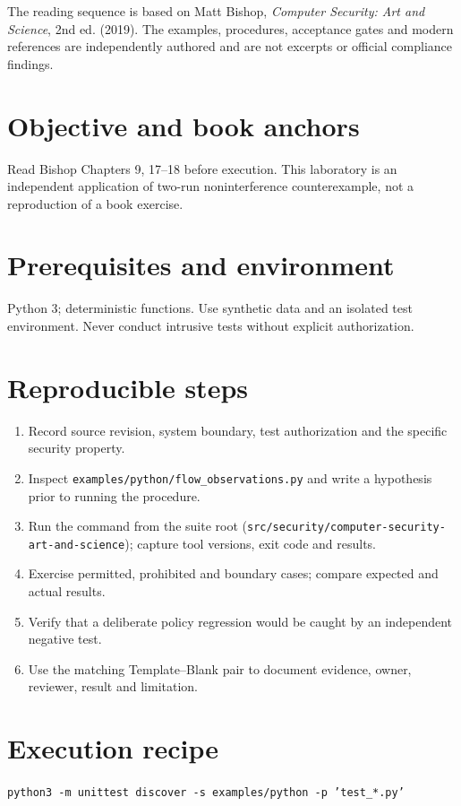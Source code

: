 \documentclass[10pt,letterpaper]{article}
\begin{document}
\makedoctocpage
\begin{notebox}
The reading sequence is based on Matt Bishop, \emph{Computer Security: Art and Science}, 2nd ed. (2019). The examples, procedures, acceptance gates and modern references are independently authored and are not excerpts or official compliance findings.
\end{notebox}
\section{Objective and book anchors}
Read Bishop Chapters 9, 17--18 before execution. This laboratory is an independent application of two-run noninterference counterexample, not a reproduction of a book exercise.
\section{Prerequisites and environment}
Python 3; deterministic functions. Use synthetic data and an isolated test environment. Never conduct intrusive tests without explicit authorization.
\section{Reproducible steps}
\begin{enumerate}
\item Record source revision, system boundary, test authorization and the specific security property.
\item Inspect \texttt{examples/python/flow\_observations.py} and write a hypothesis prior to running the procedure.
\item Run the command from the suite root (\texttt{src/security/computer-security-art-and-science}); capture tool versions, exit code and results.
\item Exercise permitted, prohibited and boundary cases; compare expected and actual results.
\item Verify that a deliberate policy regression would be caught by an independent negative test.
\item Use the matching Template--Blank pair to document evidence, owner, reviewer, result and limitation.
\end{enumerate}
\section{Execution recipe}
\begin{viewbox}\raggedright\small\texttt{python3 -m unittest discover -s examples/python -p 'test\_*.py'}\end{viewbox}
\end{document}
